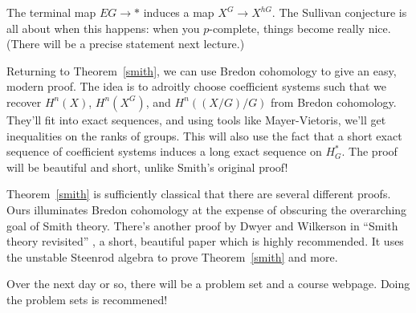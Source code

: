 The terminal map $EG\to *$ induces a map $X^G\to X^{hG}$. The Sullivan conjecture is all about when this happens:
when you $p$-complete, things become really nice. (There will be a precise statement next lecture.)

Returning to Theorem~\ref{smith}, we can use Bredon cohomology to give an easy, modern proof. The idea is to
adroitly choose coefficient systems such that we recover $H^n(X)$, $H^n(X^G)$, and $H^n((X/G)/G)$ from Bredon
cohomology. They'll fit into exact sequences, and using tools like Mayer-Vietoris, we'll get inequalities on the
ranks of groups. This will also use the fact that a short exact sequence of coefficient systems induces a long
exact sequence on $H_G^*$. The proof will be beautiful and short, unlike Smith's original proof!

Theorem~\ref{smith} is sufficiently classical that there are several different proofs. Ours illuminates Bredon
cohomology at the expense of obscuring the overarching goal of Smith theory. There's another proof by Dwyer and
Wilkerson in ``Smith theory revisited'' \cite{SmithRevisit}, a short, beautiful paper which is highly recommended. It uses the unstable
Steenrod algebra to prove Theorem~\ref{smith} and more. %

Over the next day or so, there will be a problem set and a course webpage. Doing the problem sets is recommened!
